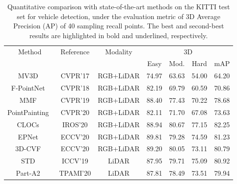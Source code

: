\documentclass[twocolumn]{svjour3}
\begin{document}
\setlength{\tabcolsep}{15pt}
\begin{table*}[t]
\centering
\caption{Quantitative comparison with state-of-the-art methods on the KITTI test set for vehicle detection, under the evaluation metric of 3D Average Precision (AP) of 40 sampling recall points. The best and second-best results are highlighted in bold and underlined, respectively.}
\label{table:kitti_test}
\begin{tabular}{c|c|c|cccc} 
\toprule
\multirow{2}{*}{Method} & \multirow{2}{*}{Reference} & \multirow{2}{*}{Modality} & \multicolumn{4}{c}{ 3D   }      \\
&                            &                           & Easy  & Mod. & Hard  & mAP    \\ 
\hline
MV3D~\citep{chen2017multi}		               & CVPR'17                   & RGB+LiDAR                 & 74.97          & 63.63          & 54.00             & 64.20           \\
F-PointNet~\citep{qi2018frustum}                 & CVPR'18                   & RGB+LiDAR                 & 82.19          & 69.79          & 60.59          & 70.86           \\
MMF~\citep{liang2019multi}                     & CVPR'19                   & RGB+LiDAR                 & 88.40           & 77.43          & 70.22          & 78.68           \\
PointPainting~\citep{vora2020pointpainting}  & CVPR'20                  & RGB+LiDAR                 & 82.11          & 71.70           & 67.08          & 73.63           \\
CLOCs~\citep{pang2020clocs}                      & IROS'20                  & RGB+LiDAR                 & 88.94          & 80.67          & 77.15          & 82.25           \\
EPNet~\citep{huang2020epnet}    & ECCV'20                   & RGB+LiDAR                 & 89.81          & 79.28          & 74.59          & 81.23           \\
3D-CVF~\citep{yoo20203d}   & ECCV'20                   & RGB+LiDAR                 & 89.20           & 80.05          & 73.11          & 80.79           \\ 
\hline
STD~\citep{yang2019std}                     & ICCV'19                  & LiDAR                     & 87.95 & 79.71    & 75.09 & 80.92  \\
Part-A2~\citep{shi2020points}                 & TPAMI'20                 & LiDAR                     & 87.81 & 78.49    & 73.51 & 79.94  \\

\end{tabular}
\end{table*}
\end{document}
